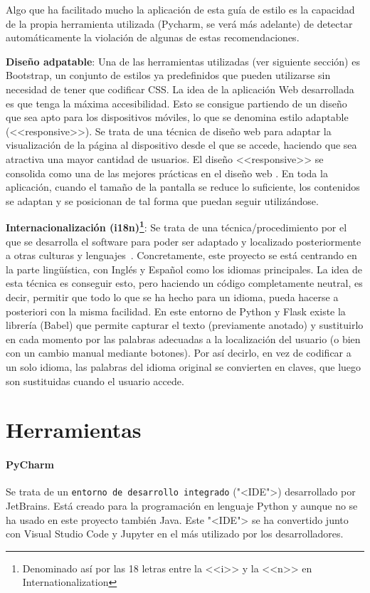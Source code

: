 Algo que ha facilitado mucho la aplicación de esta guía de estilo es la
capacidad de la propia herramienta utilizada (Pycharm, se verá más adelante) de
detectar automáticamente la violación de algunas de estas recomendaciones.

\textbf{Diseño adpatable}: Una de las herramientas utilizadas (ver siguiente
sección) es Bootstrap, un conjunto de estilos ya predefinidos que pueden
utilizarse sin necesidad de tener que codificar CSS. La idea de la aplicación
Web desarrollada es que tenga la máxima accesibilidad. Esto se consigue
partiendo de un diseño que sea apto para los dispositivos móviles, lo que se
denomina estilo adaptable (<<responsive>>). Se trata de una técnica de diseño
web para adaptar la visualización de la página al dispositivo desde el que se
accede, haciendo que sea atractiva una mayor cantidad de usuarios. El diseño
<<responsive>> se consolida como una de las mejores prácticas en el diseño web
\cite{40defiebre}. En toda la aplicación, cuando el tamaño de la pantalla se
reduce lo suficiente, los contenidos se adaptan y se posicionan de tal forma que
puedan seguir utilizándose.

\textbf{Internacionalización (i18n)\footnote{Denominado así por las 18 letras
entre la <<i>> y la <<n>> en Internationalization}}: Se trata de una
técnica/procedimiento por el que se desarrolla el software para poder ser
adaptado y localizado posteriormente a otras culturas y
lenguajes~\cite{lokalise}. Concretamente, este proyecto se está centrando en la
parte lingüística, con Inglés y Español como los idiomas principales. La idea de
esta técnica es conseguir esto, pero haciendo un código completamente neutral,
es decir, permitir que todo lo que se ha hecho para un idioma, pueda hacerse a
posteriori con la misma facilidad. En este entorno de Python y Flask existe la
librería (Babel) que permite capturar el texto (previamente anotado) y
sustituirlo en cada momento por las palabras adecuadas a la localización del
usuario (o bien con un cambio manual mediante botones). Por así decirlo, en vez
de codificar a un solo idioma, las palabras del idioma original se convierten en
claves, que luego son sustituidas cuando el usuario accede.


\section{Herramientas}

\paragraph{PyCharm}
Se trata de un \texttt{entorno de desarrollo integrado} ("<IDE">) desarrollado
por JetBrains. Está creado para la programación en lenguaje Python y aunque no
se ha usado en este proyecto también Java. Este "<IDE"> se ha convertido junto
con Visual Studio Code y Jupyter en el más utilizado por los desarrolladores.

